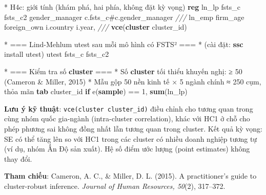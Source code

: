 \documentclass[
  a4paper,
  13pt]{extreport}
\newenvironment{Shaded}{}{}
\newcommand{\CommentTok}[1]{\textcolor[rgb]{0.38,0.63,0.69}{\textit{#1}}}
\newcommand{\FunctionTok}[1]{\textcolor[rgb]{0.02,0.16,0.49}{#1}}
\newcommand{\KeywordTok}[1]{\textcolor[rgb]{0.00,0.44,0.13}{\textbf{#1}}}
\newcommand{\NormalTok}[1]{#1}
\begin{document}
\begin{Shaded}
\begin{Highlighting}[]
\NormalTok{* H4c: giới tính (khám phá, hai phía, không đặt kỳ vọng)}
\KeywordTok{reg}\NormalTok{ ln\_lp fsts\_c fsts\_c2 gender\_manager c.fsts\_c\#c.gender\_manager }\CommentTok{///}
\NormalTok{    ln\_emp firm\_age foreign\_own i.country i.}\FunctionTok{year}\NormalTok{, }\CommentTok{///}
    \KeywordTok{vce}\NormalTok{(}\KeywordTok{cluster}\NormalTok{ cluster\_id)}

\NormalTok{* === Lind{-}Mehlum utest sau mỗi mô hình có FSTS² ===}
\NormalTok{* (cài đặt: }\KeywordTok{ssc}\NormalTok{ install utest)}
\NormalTok{utest fsts\_c fsts\_c2}

\NormalTok{* === Kiểm tra số }\KeywordTok{cluster}\NormalTok{ ===}
\NormalTok{* Số }\KeywordTok{cluster}\NormalTok{ tối thiểu khuyến nghị: ≥ 50 (Cameron \& Miller, 2015)}
\NormalTok{* Mẫu gộp 50 nền kinh tế × 5 ngành chính ≈ 250 cụm, thỏa mãn}
\KeywordTok{tab}\NormalTok{ cluster\_id }\KeywordTok{if} \FunctionTok{e}\NormalTok{(}\KeywordTok{sample}\NormalTok{) == 1, }\KeywordTok{sum}\NormalTok{(ln\_lp)}
\end{Highlighting}
\end{Shaded}

\textbf{Lưu ý kỹ thuật}: \texttt{vce(cluster\ cluster\_id)} điều chỉnh
cho tương quan trong cùng nhóm quốc gia-ngành (intra-cluster
correlation), khác với HC1 ở chỗ cho phép phương sai không đồng nhất lẫn
tương quan trong cluster. Kết quả kỳ vọng: SE có thể tăng lên so với HC1
trong các cluster có nhiều doanh nghiệp tương tự (ví dụ, nhóm Ấn Độ sản
xuất). Hệ số điểm ước lượng (point estimates) không thay đổi.

\textbf{Tham chiếu}: Cameron, A. C., \& Miller, D. L. (2015). A
practitioner's guide to cluster-robust inference. \emph{Journal of Human
Resources, 50}(2), 317--372.
\end{document}
